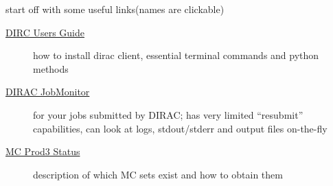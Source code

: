 \documentclass{beamer}
\begin{document}
\begin{frame}
  \titlepage
\end{frame}


\begin{frame}{start off with some useful links}{(names are clickable)}
    \begin{description}
        \item[\href{https://forge.in2p3.fr/projects/cta_dirac/wiki/CTA-DIRAC_Users_Guide}
                    {DIRC Users Guide}]
            how to install dirac client, essential terminal commands and python methods
            \bigskip
        \item[\href{https://ccdcta-web.in2p3.fr/DIRAC/s:CTA/g:cta_user/?view=tabs&theme=
                    Grey&url_state=1|*DIRAC.JobMonitor.classes.JobMonitor:,}
                    {DIRAC JobMonitor}]
            for your jobs submitted by DIRAC; has very limited ``resubmit'' capabilities,
            can look at logs, stdout/stderr and output files on-the-fly
            \bigskip
        \item[\href{https://forge.in2p3.fr/projects/cta_dirac/wiki/
                    CTA-DIRAC_MC_PROD3_Status}
                    {MC Prod3 Status}]
            description of which MC sets exist and how to obtain them
    \end{description}
\end{frame}
\end{document}
